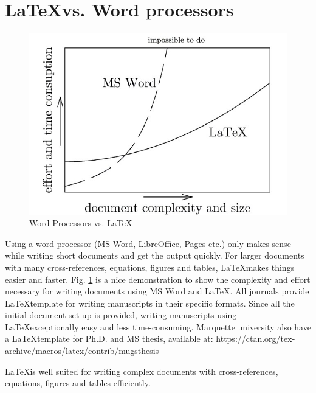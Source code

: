 \documentclass[a4paper, 12pt, one column]{article}
\begin{document}
\section{\LaTeX\space vs. Word processors}
\begin{linenumbers}

    
\begin{figure}[!httb]
    \centering
    \includegraphics[width=0.6\linewidth]{wordvslatex.jpg}
    \caption{Word Processors vs. \LaTeX}
    \label{wordvslatex}
    \end{figure}
Using a word-processor (MS Word, LibreOffice,  Pages etc.) only makes sense while writing short documents and get the output quickly. For larger documents with many cross-references, equations,  figures and tables, \LaTeX \space makes things easier and faster. Fig. \ref{wordvslatex} is a nice demonstration to show the complexity and effort necessary for writing documents using MS Word and \LaTeX  \cite{BibEntry2020Apr}. All journals provide \LaTeX \space template for writing manuscripts in their specific formats. Since all the initial document set up is provided,  writing manuscripts using \LaTeX \space exceptionally easy and less time-consuming. Marquette university also have a \LaTeX \space template for Ph.D. and MS thesis, available at: \textcolor{blue}{\url{https://ctan.org/tex-archive/macros/latex/contrib/mugsthesis}}

\end{linenumbers}

\vspace{0.3cm}

 {
        {
        \begin{minipage}{0.9\textwidth}
            \centering
           \LaTeX \space is well suited for writing complex documents with cross-references, equations, figures and tables efficiently. 
        \end{minipage}
        }
    }
\end{document}
